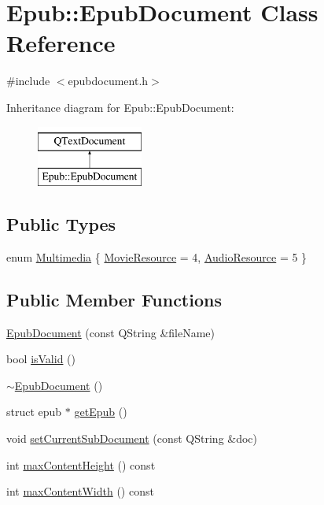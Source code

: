 \hypertarget{classEpub_1_1EpubDocument}{\section{Epub\+:\+:Epub\+Document Class Reference}
\label{classEpub_1_1EpubDocument}
}


{\ttfamily \#include $<$epubdocument.\+h$>$}

Inheritance diagram for Epub\+:\+:Epub\+Document\+:\begin{figure}[H]
\begin{center}
\leavevmode
\includegraphics[height=2.000000cm]{classEpub_1_1EpubDocument}
\end{center}
\end{figure}
\subsection*{Public Types}
\begin{DoxyCompactItemize}
\item 
enum \hyperlink{classEpub_1_1EpubDocument_a8727955892e8fa3c5eaef8d9d3ae7c8f}{Multimedia} \{ \hyperlink{classEpub_1_1EpubDocument_a8727955892e8fa3c5eaef8d9d3ae7c8fa75a15290b8e57ccaad8ff2dee9593636}{Movie\+Resource} = 4, 
\hyperlink{classEpub_1_1EpubDocument_a8727955892e8fa3c5eaef8d9d3ae7c8fa858f54dd2eb2907bbf1be8fbe0d1c054}{Audio\+Resource} = 5
 \}
\end{DoxyCompactItemize}
\subsection*{Public Member Functions}
\begin{DoxyCompactItemize}
\item 
\hyperlink{classEpub_1_1EpubDocument_ab359edd4365ca02ec3039245910987dd}{Epub\+Document} (const Q\+String \&file\+Name)
\item 
bool \hyperlink{classEpub_1_1EpubDocument_ad47e936fccea93a28d1ebb0cf3b36624}{is\+Valid} ()
\item 
\hyperlink{classEpub_1_1EpubDocument_aa2390e6317e4ba6e049bbec5aade68e2}{$\sim$\+Epub\+Document} ()
\item 
struct epub $\ast$ \hyperlink{classEpub_1_1EpubDocument_a37cb6d97564a7764b22e44523889267e}{get\+Epub} ()
\item 
void \hyperlink{classEpub_1_1EpubDocument_a6e36681fb7d345bf885150d884513fdf}{set\+Current\+Sub\+Document} (const Q\+String \&doc)
\item 
int \hyperlink{classEpub_1_1EpubDocument_ae8f068a3e013d7736293a195986d71cb}{max\+Content\+Height} () const 
\item 
int \hyperlink{classEpub_1_1EpubDocument_a214f084adb359a132c522ffec0d61aeb}{max\+Content\+Width} () const 
\end{DoxyCompactItemize}
